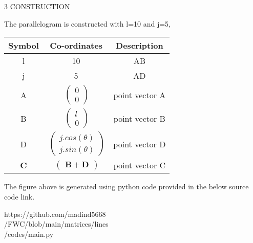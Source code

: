 \documentclass[a4paper,12pt]{report}
\let\vec\mathbf
\begin{document}
\begin{multicols}{2}
\vspace{2mm}\\
\vspace{2mm}\\
\centering \large\textsc{3  C}\footnotesize\textsc{ONSTRUCTION}\vspace{5mm}\\
\raggedright\large{The parallelogram is constructed with l=10 and j=5,} 
\begin{center}
    \label{tab:truthtable}
    \setlength{\arrayrulewidth}{0.2mm}
\setlength{\tabcolsep}{5pt}
\renewcommand{\arraystretch}{1.25}
    \begin{tabular}{|c|c|c|}
    \hline %
      \large\textbf{Symbol} & \large\textbf{Co-ordinates} & \large\textbf{Description}\\
      \hline
	\large l & 10 & \large AB \\
	\large j & 5 & \large AD\\
	\large A &  $\ \begin{pmatrix} 0\\0 \end{pmatrix}$  & \large point vector A\\
	\large B &  $\ \begin{pmatrix} l\\0 \end{pmatrix}$ & \large point vector B\\
	\large D &  $\ \begin{pmatrix} j.cos(\theta)\\j.sin(\theta) \end{pmatrix}$ & \large point vector D\\ 
	\large\textbf{C} & $\ \begin{pmatrix} \vec{B+D} \end{pmatrix}$ & \large point vector C\\ 
      \hline
   \end{tabular}
 \end{center}\vspace{5mm} 
\raggedright\large{The figure above is generated using python code provided in the below source code link.}\vspace{2mm}\\
\begin{mdframed}
\raggedright\large{https://github.com/madind5668 \\ /FWC/blob/main/matrices/lines\\ /codes/main.py}
\end{mdframed}
\end{multicols}
\end{document}
